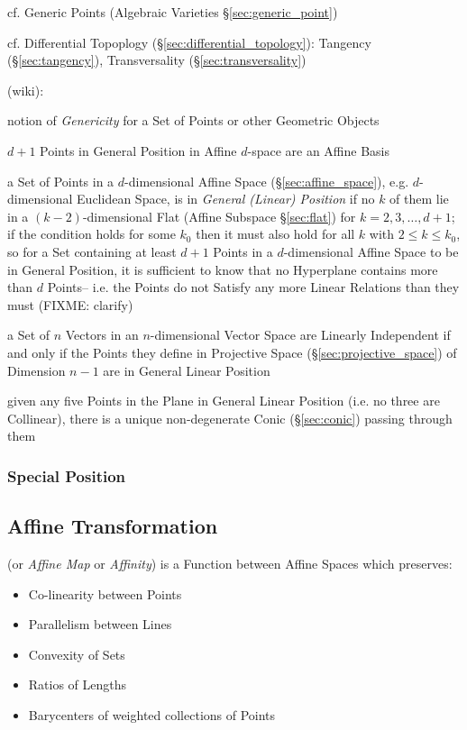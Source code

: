 \fist cf. Generic Points (Algebraic Varieties \S\ref{sec:generic_point})

\fist cf. Differential Topoplogy (\S\ref{sec:differential_topology}): Tangency
(\S\ref{sec:tangency}), Transversality (\S\ref{sec:transversality})

(wiki):

notion of \emph{Genericity} for a Set of Points or other Geometric Objects

$d+1$ Points in General Position in Affine $d$-space are an Affine Basis

a Set of Points in a $d$-dimensional Affine Space (\S\ref{sec:affine_space}),
e.g. $d$-dimensional Euclidean Space, is in \emph{General (Linear) Position} if
no $k$ of them lie in a $(k-2)$-dimensional Flat (Affine Subspace
\S\ref{sec:flat}) for $k = 2,3,\ldots,d+1$; if the condition holds for some
$k_0$ then it must also hold for all $k$ with $2 \leq k \leq k_0$, so for a
Set containing at least $d+1$ Points in a $d$-dimensional Affine Space to be in
General Position, it is sufficient to know that no Hyperplane contains more
than $d$ Points-- i.e. the Points do not Satisfy any more Linear Relations than
they must (FIXME: clarify)

a Set of $n$ Vectors in an $n$-dimensional Vector Space are Linearly
Independent if and only if the Points they define in Projective Space
(\S\ref{sec:projective_space}) of Dimension $n-1$ are in General Linear
Position

given any five Points in the Plane in General Linear Position (i.e. no three
are Collinear), there is a unique non-degenerate Conic (\S\ref{sec:conic})
passing through them



\subsubsection{Special Position}\label{sec:special_position}



\subsection{Affine Transformation}\label{sec:affine_transformation}

(or \emph{Affine Map} or \emph{Affinity}) is a Function between Affine Spaces
which preserves:
\begin{itemize}
  \item Co-linearity between Points
  \item Parallelism between Lines
  \item Convexity of Sets
  \item Ratios of Lengths
  \item Barycenters of weighted collections of Points
\end{itemize}

